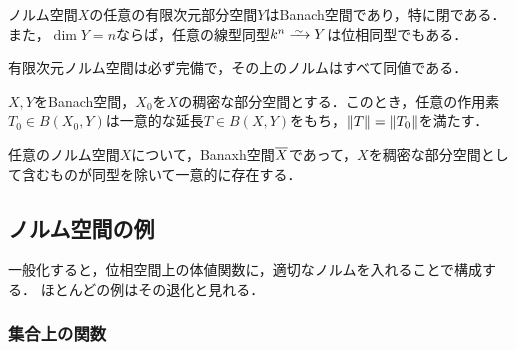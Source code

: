 \documentclass[uplatex,dvipdfmx]{jsreport}
\begin{document}
\begin{proposition}[自明なBanach部分空間]\label{prop-finite-subspaces}
    ノルム空間$X$の任意の有限次元部分空間$Y$はBanach空間であり，特に閉である．
    また，$\dim Y=n$ならば，任意の線型同型$k^n\iso Y$は位相同型でもある．
\end{proposition}
\begin{remark}
    有限次元ノルム空間は必ず完備で，その上のノルムはすべて同値である．
\end{remark}

\begin{proposition}\label{prop-extension-of-operator-on-dense-subset}
    $X,Y$をBanach空間，$X_0$を$X$の稠密な部分空間とする．このとき，任意の作用素$T_0\in B(X_0,Y)$は一意的な延長$T\in B(X,Y)$をもち，$\|T\|=\|T_0\|$を満たす．
\end{proposition}

\begin{proposition}
    任意のノルム空間$X$について，Banaxh空間$\overline{X}$であって，$X$を稠密な部分空間として含むものが同型を除いて一意的に存在する．
\end{proposition}

\subsection{ノルム空間の例}

\begin{tcolorbox}[colframe=ForestGreen, colback=ForestGreen!10!white,breakable,colbacktitle=ForestGreen!40!white,coltitle=black,fonttitle=\bfseries\sffamily,
title=]
    一般化すると，位相空間上の体値関数に，適切なノルムを入れることで構成する．
    ほとんどの例はその退化と見れる．
\end{tcolorbox}

\subsubsection{集合上の関数}
\end{document}
